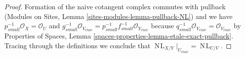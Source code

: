 \documentclass[10pt,a4paper]{amsart}
\theoremstyle{plain}
\theoremstyle{definition}
\theoremstyle{remark}
\numberwithin{equation}{subsection}
\def\NL{\mathop{N\!L}\nolimits}
\def\etale{{\acute{e}tale}}
\begin{document}
\begin{proof}
Formation of the naive cotangent complex commutes with pullback
(Modules on Sites, Lemma \ref{sites-modules-lemma-pullback-NL})
and we have $p_{small}^{-1}\mathcal{O}_X = \mathcal{O}_U$ and
$g_{small}^{-1}\mathcal{O}_{V_\etale} =
p_{small}^{-1}f_{small}^{-1}\mathcal{O}_{Y_\etale}$
because $q_{small}^{-1}\mathcal{O}_{Y_\etale} =
\mathcal{O}_{V_\etale}$ by Properties of Spaces, Lemma
\ref{spaces-properties-lemma-etale-exact-pullback}.
Tracing through the definitions we conclude that
$\NL_{X/Y}|_{U_\etale} = \NL_{U/V}$.
\end{proof}
\end{document}
